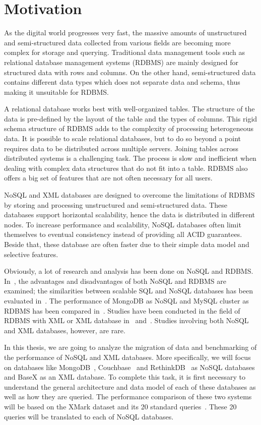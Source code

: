 \documentclass[a4paper,12pt]{book}
\begin{document}
		\section{Motivation}
		\label{motivation}
		    As the digital world progresses very fast, the massive amounts of unstructured and semi-structured data collected from various fields are becoming more complex for storage and querying. Traditional data management tools such as relational database management systems (RDBMS) are mainly designed for structured data with rows and columns. On the other hand, semi-structured data contains different data types which does not separate data and schema, thus making it unsuitable for RDBMS.
\par		
A relational database works best with well-organized tables. The structure of the data is pre-defined by the layout of the table and the types of columns. This rigid schema structure of RDBMS adds to the complexity of processing heterogeneous data. It is possible to scale relational databases, but to do so beyond a point requires data to be distributed across multiple servers. Joining tables across distributed systems is a challenging task. The process is slow and inefficient when dealing with complex data structures that do not fit into a table. RDBMS also offers a big set of features that are not often necessary for all users.
\par
NoSQL and XML databases are designed to overcome the limitations of RDBMS by storing and processing unstructured and semi-structured data. These databases support horizontal scalability, hence the data is distributed in different nodes. To increase performance and scalability, NoSQL databases often limit themselves to eventual consistency instead of providing all ACID guarantees. Beside that, these database are often faster due to their simple data model and selective features.
\par		
Obviously, a lot of research and analysis has been done on NoSQL and RDBMS. In~\cite{nance2013nosql}, the advantages and disadvantages of both NoSQL and RDBMS are examined; the similarities between scalable SQL and NoSQL databases has been evaluated in~\cite{cattell2011scalable}. The performance of MongoDB as NoSQL and MySQL cluster as RDBMS has been compared in~\cite{hadjigeorgiou2013rdbms}. Studies have been conducted in the field of RDBMS with XML or XML database in~\cite{jiang2002xparent} and~\cite{shanmugasundaram1999relational}. Studies involving both NoSQL and XML databases, however, are rare.
\par
In this thesis, we are going to analyze the migration of data and benchmarking of the performance of NoSQL and XML databases. More specifically, we will focus on databases like MongoDB~\cite{mongodb:org}, Couchbase~\cite{couchbase} and RethinkDB~\cite{rethinkdb}  as NoSQL databases and BaseX as an XML database. To complete this task, it is first necessary to understand the general architecture and data model of each of these databases as well as how they are queried. The performance comparison of these two systems will be based on the XMark dataset and its 20 standard queries~\citep{xmark/original}. These 20 queries will be translated to each of NoSQL databases.
\end{document}
